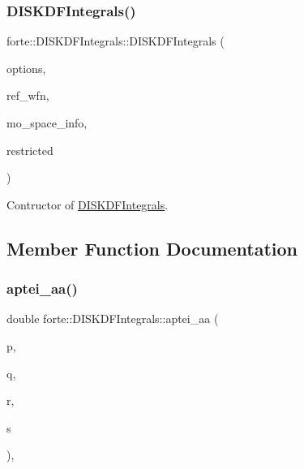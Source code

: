 \subsubsection{\texorpdfstring{D\+I\+S\+K\+D\+F\+Integrals()}{DISKDFIntegrals()}}
{\footnotesize\ttfamily forte\+::\+D\+I\+S\+K\+D\+F\+Integrals\+::\+D\+I\+S\+K\+D\+F\+Integrals (\begin{DoxyParamCaption}\item[{std\+::shared\+\_\+ptr$<$ \mbox{\hyperlink{classforte_1_1_forte_options}{Forte\+Options}} $>$}]{options,  }\item[{std\+::shared\+\_\+ptr$<$ psi\+::\+Wavefunction $>$}]{ref\+\_\+wfn,  }\item[{std\+::shared\+\_\+ptr$<$ \mbox{\hyperlink{classforte_1_1_m_o_space_info}{M\+O\+Space\+Info}} $>$}]{mo\+\_\+space\+\_\+info,  }\item[{\mbox{\hyperlink{namespaceforte_a7defa2660dd3eb07aa81176b90781be7}{Integral\+Spin\+Restriction}}}]{restricted }\end{DoxyParamCaption})}



Contructor of \mbox{\hyperlink{classforte_1_1_d_i_s_k_d_f_integrals}{D\+I\+S\+K\+D\+F\+Integrals}}. 



\subsection{Member Function Documentation}
\mbox{\label{classforte_1_1_d_i_s_k_d_f_integrals_a3a815a39bc2f01a1cb5398e857f56285}} 
\subsubsection{\texorpdfstring{aptei\+\_\+aa()}{aptei\_aa()}}
{\footnotesize\ttfamily double forte\+::\+D\+I\+S\+K\+D\+F\+Integrals\+::aptei\+\_\+aa (\begin{DoxyParamCaption}\item[{size\+\_\+t}]{p,  }\item[{size\+\_\+t}]{q,  }\item[{size\+\_\+t}]{r,  }\item[{size\+\_\+t}]{s }\end{DoxyParamCaption})\hspace{0.3cm}{\ttfamily [override]}, {\ttfamily [virtual]}}



